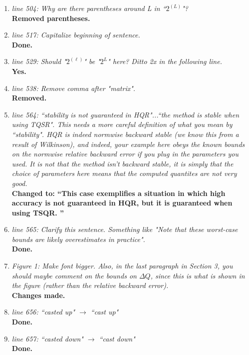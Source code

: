 \documentclass[final,onefignum,onetabnum]{siamart190516}
\begin{document}
\begin{enumerate}
	\item {\it line 504: Why are there parentheses around L in ``$2^{(L)}$"?}\\
	{\bf Removed parentheses.}
	
	\item {\it line 517: Capitalize beginning of sentence.}\\
	{\bf Done.}
	
	\item {\it line 529: Should "$2^{(\ell)}$" be "$2^L$" here? Ditto 2x in the following line. }\\
	{\bf Yes.}
	
	\item {\it line 538: Remove comma after "matrix".}\\
	{\bf Removed.}
	
	\item {\it line 564: ``stability is not guaranteed in HQR"...``the method is stable when using TQSR". This needs a more careful definition of what you mean by ``stability". HQR is indeed normwise backward stable (we know this from a result of Wilkinson), and indeed, your example here obeys the known bounds on the normwise relative backward error if you plug in the parameters you used. It is not that the method isn't backward stable, it is simply that the choice of parameters here means that the computed quantites are not very good. }\\
	{\bf Changed to: ``This case exemplifies a situation in which high accuracy is not guaranteed in HQR, but it is guaranteed when using TSQR. ''}
	
	
	\item {\it line 565: Clarify this sentence. Something like "Note that these worst-case bounds are likely overestimates in practice".}\\
	{\bf Done.}
	
	\item {\it Figure 1: Make font bigger. Also, in the last paragraph in Section 3, you should maybe comment on the bounds on $\Delta Q$, since this is what is shown in the figure (rather than the relative backward error). }\\
	{\bf Changes made.}
	
	\item {\it line 656: ``casted up" $\rightarrow$ ``cast up"}\\
	{\bf Done.}
	
	\item {\it line 657: ``casted down" $\rightarrow$ ``cast down"}\\
	{\bf Done.}
	

\end{enumerate}
\end{document}
